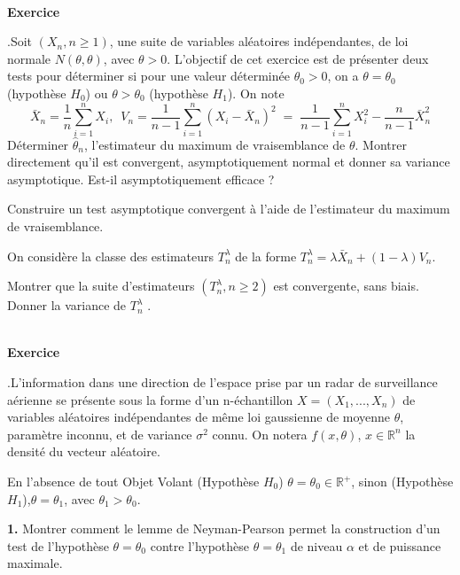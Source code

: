 \documentclass[11pt,a4paper]{article}
\newcommand{\R}{\mathbb{R}}\newcommand{\C}{\mathbb{C}}
\def \R{\mathbb{R}}
\def \Sum{\displaystyle\sum}
\def \ni{\noindent}
\newcounter{exo}
\def\exo{\mbox{}\\[0em]\hspace*{0em}\bf Exercice
\addtocounter{exo}{1}\arabic{exo}.\rm\hspace{1ex}}
\begin{document}
\vskip 0.3cm


\exo Soit $(X_n, n \geq 1)$, une suite de variables aléatoires
indépendantes, de loi normale $N(\theta, \theta)$, avec $\theta>
0$. L'objectif de cet exercice est de présenter deux tests pour
déterminer si pour une valeur déterminée $\theta_0 > 0$, on a
$\theta = \theta_0$ (hypothèse $H_0$) ou $\theta > \theta_0$
(hypothèse $H_1$). On note
$$ \bar X_n = \frac{1}{n} \Sum_{i=1}^n X_i,\: \; V_{n} =
\frac{1}{n-1}\Sum_{i=1}^n (X_i - \bar X_n)^2 \;=\;
\frac{1}{n-1}\Sum_{i=1}^n X_i^2 - \frac{n}{n-1} \bar X_n^2
$$
\ni {\bf 1.} Déterminer $\hat \theta_n$, l'estimateur du maximum
de vraisemblance de $\theta$. Montrer directement qu'il est
convergent, asymptotiquement normal et donner sa variance
asymptotique. Est-il asymptotiquement efficace ?

\vspace{1mm}

\ni {\bf 2.} Construire un test asymptotique convergent à l'aide
de l'estimateur du maximum de vraisemblance.

\vspace{1mm}

\ni On considère la classe des estimateurs $T_n^{\lambda}$ de la
forme $T_n^{\lambda} = \lambda \bar X_n + (1- \lambda) V_n$.

\vspace{1mm}

 \ni {\bf 3.} Montrer que la suite d'estimateurs
$(T^{\lambda}_n, n \geq 2)$ est convergente, sans biais. Donner la
variance de $T^{\lambda}_n$ .



\exo L'information dans une direction de l'espace prise par un
radar de surveillance aérienne se présente sous la forme d'un
n-échantillon $X = (X_1,...,X_n)$ de variables aléatoires
indépendantes de même loi gaussienne de moyenne $\theta$,
paramètre inconnu, et de variance $\sigma^2$ connu. On notera
$f(x,\theta)$, $x \in \R^n$ la densité du vecteur aléatoire.

\vspace{1mm}

\ni En l'absence de tout Objet Volant (Hypothèse $H_0$) $\theta =
\theta_0 \in \R^+$, sinon (Hypothèse $H_1$),$\theta = \theta_1$,
avec $\theta_1 > \theta_0$.

\vspace{1mm}

{\bf 1.} Montrer comment le lemme de Neyman-Pearson permet la
construction d'un test de l'hypothèse $\theta = \theta_0$ contre
l'hypothèse $\theta = \theta_1$ de niveau $\alpha$ et de puissance
maximale.
\end{document}
